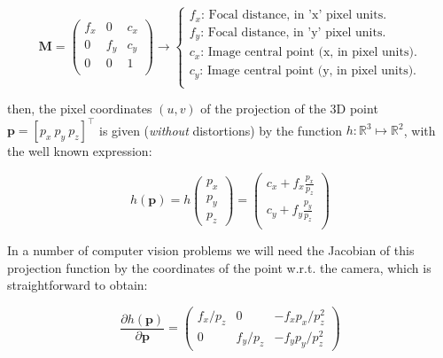 \documentclass[a4paper,11pt]{report}
\begin{document}
\begin{equation}
\mathbf{M}=
\left(
\begin{array}{ccc}
 f_x & 0 & c_x \\
  0  & f_y & c_y \\
 0 & 0 & 1 \\
\end{array}
\right)
\longrightarrow
\left\{
\begin{array}{l}
 f_x\text{: Focal distance, in 'x' pixel units.} \\
 f_y\text{: Focal distance, in 'y' pixel units.} \\
 c_x\text{: Image central point (x, in pixel units).} \\
 c_y\text{: Image central point (y, in pixel units).} \\
\end{array}
\right.
\end{equation}


\noindent then, the pixel coordinates $(u,v)$ of the projection of the
3D point $\mathbf{p}=[p_x ~ p_y ~ p_z]^\top$
is given (\emph{without} distortions) by the function $h: \mathbb{R}^3 \mapsto \mathbb{R}^2$,
with the well known expression:

\begin{equation}
h(\mathbf{p}) =
h\left(
\begin{array}{c}
 p_x \\ p_y \\p_z
\end{array}
\right) =
\left(
\begin{array}{c}
 c_x + f_x  \frac{p_x}{p_z} \\
 c_y + f_y  \frac{p_y}{p_z} \\
\end{array}
\right)
\end{equation}

In a number of computer vision problems we will need the Jacobian of this
projection function by the coordinates of the point w.r.t. the camera, which
is straightforward to obtain:

\begin{equation}
\label{eq:jacob_pinhole}
\frac{\partial h(\mathbf{p})}{\partial \mathbf{p}} =
\left(
\begin{array}{ccc}
 f_x/p_z  &    0    &  -f_x p_x/p_z^2   \\
 0 & f_y/p_z  &  -f_y p_y/ p_z^2
\end{array}
\right)
\end{equation}
\end{document}
